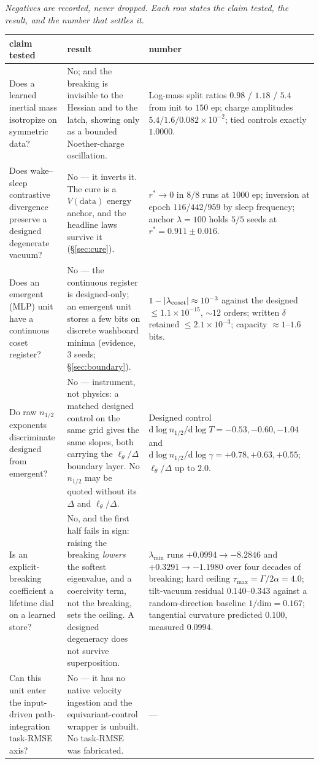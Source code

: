 \documentclass{article}
\begin{document}
\emph{Negatives are recorded, never dropped. Each row states the claim tested, the result, and the number that settles it.}

\begin{center}\scriptsize
\begin{tabular}{@{}p{1.52in} p{1.52in} p{2.06in}@{}}
\toprule
claim tested & result & number \\
\midrule
Does a learned inertial mass isotropize on symmetric data? &
No; and the breaking is invisible to the Hessian and to the latch, showing only as a bounded Noether-charge oscillation.   &
Log-mass split ratios $0.98$ / $1.18$ / $5.4$ from init to $150$ ep; charge amplitudes $5.4/1.6/0.082{\times}10^{-2}$; tied controls exactly $1.0000$. \\[2pt]
Does wake--sleep contrastive divergence preserve a designed degenerate vacuum? &
No --- it inverts it. The cure is a $V(\text{data})$ energy anchor, and the headline laws survive it (\S\ref{sec:cure}). &
$r^*\to0$ in $8/8$ runs at $1000$ ep; inversion at epoch $116$/$442$/$959$ by sleep frequency; anchor $\lambda{=}100$ holds $5/5$ seeds at $r^*{=}0.911\pm0.016$. \\[2pt]
Does an emergent (MLP) unit have a continuous coset register? &
No --- the continuous register is designed-only; an emergent unit stores a few bits on discrete washboard minima (evidence, $3$ seeds; \S\ref{sec:boundary}). &
$1-|\lambda_{\rm coset}|\approx10^{-3}$ against the designed $\le1.1{\times}10^{-15}$, $\sim\!12$ orders; written $\delta$ retained $\le2.1{\times}10^{-3}$; capacity $\approx1$--$1.6$ bits. \\[2pt]
Do raw $n_{1/2}$ exponents discriminate designed from emergent? &
No --- instrument, not physics: a matched designed control on the same grid gives the same slopes, both carrying the $\ell_\theta/\Delta$ boundary layer. No $n_{1/2}$ may be quoted without its $\Delta$ and $\ell_\theta/\Delta$. &
Designed control $\mathrm{d}\log n_{1/2}/\mathrm{d}\log T=-0.53,-0.60,-1.04$ and $\mathrm{d}\log n_{1/2}/\mathrm{d}\log\gamma=+0.78,+0.63,+0.55$; $\ell_\theta/\Delta$ up to $2.0$. \\[2pt]
Is an explicit-breaking coefficient a lifetime dial on a learned store? &
No, and the first half fails in sign: raising the breaking \emph{lowers} the softest eigenvalue, and a coercivity term, not the breaking, sets the ceiling. A designed degeneracy does not survive superposition. &
$\lambda_{\min}$ runs $+0.0994\to-8.2846$ and $+0.3291\to-1.1980$ over four decades of breaking; hard ceiling $\tau_{\max}=\Gamma/2\alpha=4.0$; tilt-vacuum residual $0.140$--$0.343$ against a random-direction baseline $1/\mathrm{dim}=0.167$; tangential curvature predicted $0.100$, measured $0.0994$. \\[2pt]
Can this unit enter the input-driven path-integration task-RMSE axis? &
No --- it has no native velocity ingestion and the equivariant-control wrapper is unbuilt. No task-RMSE was fabricated. &
--- \\[2pt]
\bottomrule
\end{tabular}
\end{center}
\end{document}
